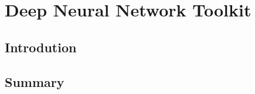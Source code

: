 \chapter{Deep Neural Network Toolkit} 
\label{chap:python-dnn}
\section{Introdution}
\section{Summary}

